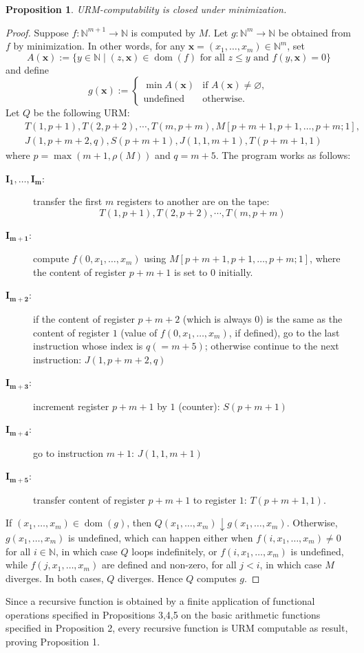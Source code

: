 \documentclass[12pt]{article}
\newtheorem{prop}{Proposition}
\begin{document}
\begin{prop} URM-computability is closed under minimization. \end{prop}
\begin{proof}  Suppose $f:\mathbb{N}^{m+1}\to \mathbb{N}$ is computed by $M$.  Let $g:\mathbb{N}^{m} \to \mathbb{N}$ be obtained from $f$ by minimization.  In other words, for any $\boldsymbol{x}=(x_1,\ldots,x_m)\in \mathbb{N}^m$, set
$$A(\boldsymbol{x}):=\lbrace y\in \mathbb{N}\mid (z,\boldsymbol{x}) \in \operatorname{dom}(f)\mbox{ for all }z\le y \mbox{ and }f(y,\boldsymbol{x})=0 \rbrace$$
and define 
\begin{displaymath}
g(\boldsymbol{x}):= \left\{
\begin{array}{ll}
\min A(\boldsymbol{x}) & \textrm{if } A(\boldsymbol{x})\ne \varnothing, \\
\textrm{undefined} & \textrm{otherwise.}
\end{array}
\right.
\end{displaymath}
Let $Q$ be the following URM:
\begin{eqnarray*}
&& T(1,p+1),T(2,p+2),\cdots, T(m,p+m),M[p+m+1,p+1,\ldots,p+m;1],\\
&& J(1,p+m+2,q),S(p+m+1),J(1,1,m+1),T(p+m+1,1)
\end{eqnarray*}
where $p=\max(m+1,\rho(M))$ and $q=m+5$.  The program works as follows:
\begin{description}
\item[$\boldsymbol{I_1,\ldots,I_m}$:] transfer the first $m$ registers to another are on the tape:
$$T(1,p+1),T(2,p+2),\cdots, T(m,p+m)$$
\item[$\boldsymbol{I_{m+1}}$:] compute $f(0,x_1,\ldots,x_m)$ using $M[p+m+1,p+1,\ldots,p+m;1]$, where the content of register $p+m+1$ is set to $0$ initially.
\item[$\boldsymbol{I_{m+2}}$:] if the content of register $p+m+2$ (which is always $0$) is the same as the content of register $1$ (value of $f(0,x_1,\ldots,x_m)$, if defined), go to the last instruction whose index is $q(=m+5)$; otherwise continue to the next instruction: $J(1,p+m+2,q)$
\item[$\boldsymbol{I_{m+3}}$:] increment register $p+m+1$ by $1$ (counter): $S(p+m+1)$
\item[$\boldsymbol{I_{m+4}}$:] go to instruction $m+1$: $J(1,1,m+1)$
\item[$\boldsymbol{I_{m+5}}$:] transfer content of register $p+m+1$ to register $1$: $T(p+m+1,1)$.
\end{description}
If $(x_1,\ldots,x_m)\in \operatorname{dom}(g)$, then $Q(x_1,\ldots,x_m)\downarrow \! g(x_1,\ldots,x_m)$.  Otherwise, $g(x_1,\ldots,x_m)$ is undefined, which can happen either when $f(i,x_1,\ldots, x_m)\ne 0$ for all $i\in \mathbb{N}$, in which case $Q$ loops indefinitely, or $f(i,x_1,\ldots, x_m)$ is undefined, while $f(j,x_1,\ldots,x_m)$ are defined and non-zero, for all $j<i$, in which case $M$ diverges.  In both cases, $Q$ diverges.  Hence $Q$ computes $g$.
\end{proof}

Since a recursive function is obtained by a finite application of functional operations specified in Propositions 3,4,5 on the basic arithmetic functions specified in Proposition 2, every recursive function is URM computable as result, proving Proposition 1.
\end{document}
